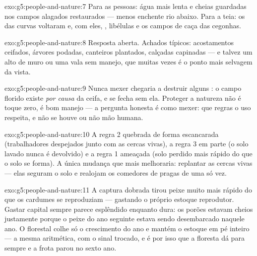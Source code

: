 \begin{solution}{exo:g5:people-and-nature:7}
Para as pessoas: água mais lenta e cheias guardadas nos campos
alagados restaurados --- menos enchente rio abaixo. Para a teia: os
 das curvas voltaram e, com eles, , libélulas e os
campos de caça das cegonhas.
\end{solution}

\begin{solution}{exo:g5:people-and-nature:8}
Resposta aberta. Achados típicos: acostamentos ceifados, árvores
podadas, canteiros plantados, calçadas capinadas --- e talvez um alto
de muro ou uma vala sem manejo, que muitas vezes é o ponto mais
selvagem da vista.
\end{solution}

\begin{solution}{exo:g5:people-and-nature:9}
Nunca mexer chegaria a destruir alguns : o campo florido
existe \emph{por causa} da ceifa, e se fecha sem ela. Proteger a
natureza não é toque zero, é bom manejo --- a pergunta honesta é como
mexer: que regras o uso respeita, e não se houve ou não mão humana.
\end{solution}

\begin{solution}{exo:g5:people-and-nature:10}
A regra 2 quebrada de forma escancarada (trabalhadores despejados
junto com as cercas vivas), a regra 3 em parte (o solo lavado nunca é
devolvido) e a regra 1 ameaçada (solo perdido mais rápido do que o
solo se forma). A única mudança que mais melhoraria: replantar as
cercas vivas --- elas seguram o solo e realojam os comedores de
pragas de uma só vez.
\end{solution}

\begin{solution}{exo:g5:people-and-nature:11}
A captura dobrada tirou peixe muito mais rápido do que os cardumes se
reproduziam --- gastando o próprio estoque reprodutor. Gastar capital
sempre parece esplêndido enquanto dura: os porões estavam cheios
justamente porque o peixe do ano seguinte estava sendo desembarcado
naquele ano. O florestal colhe só o crescimento do ano e mantém o
estoque em pé inteiro --- a mesma aritmética, com o sinal trocado, e é
por isso que a floresta dá para sempre e a frota parou no sexto ano.
\end{solution}
